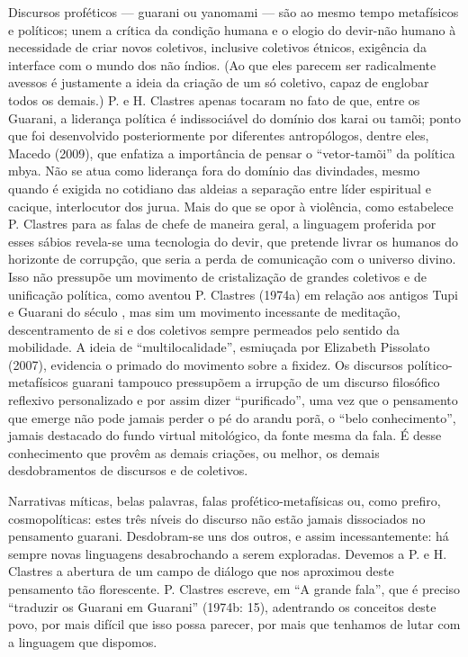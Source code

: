 Discursos proféticos --- guarani ou yanomami --- são ao mesmo tempo
metafísicos e políticos; unem a crítica da condição humana e o elogio
do devir-não humano à necessidade de criar novos coletivos, inclusive
coletivos étnicos, exigência da interface com o mundo dos não índios.
(Ao que eles parecem ser radicalmente avessos é justamente a ideia da
criação de um só coletivo, capaz de englobar todos os demais.) P. e H.
Clastres apenas tocaram no fato de que, entre os Guarani, a liderança
política é indissociável do domínio dos karai ou tamõi; ponto que foi
desenvolvido posteriormente por diferentes antropólogos, dentre eles,
Macedo (2009), que enfatiza a importância de pensar o ``vetor-tamõi'' da
política mbya. Não se atua como liderança fora do domínio das
divindades, mesmo quando é exigida no cotidiano das aldeias a separação
entre líder espiritual e cacique, interlocutor dos jurua. Mais do que
se opor à violência, como estabelece P. Clastres para as falas de chefe
de maneira geral, a linguagem proferida por esses sábios revela-se uma
tecnologia do devir, que pretende livrar os humanos do horizonte de
corrupção, que seria a perda de comunicação com o universo divino. Isso
não pressupõe um movimento de cristalização de grandes coletivos e de
unificação política, como aventou P. Clastres (1974a) em relação aos
antigos Tupi e Guarani do século , mas sim um movimento incessante
de meditação, descentramento de si e dos coletivos sempre permeados
pelo sentido da mobilidade. A ideia de ``multilocalidade'', esmiuçada por
Elizabeth Pissolato (2007), evidencia o primado do movimento sobre a
fixidez. Os discursos político-metafísicos guarani tampouco pressupõem
a irrupção de um discurso filosófico reflexivo personalizado e por
assim dizer ``purificado'', uma vez que o pensamento que emerge não pode
jamais perder o pé do arandu porã, o ``belo conhecimento'', jamais
destacado do fundo virtual mitológico, da fonte mesma da fala. É desse
conhecimento que provêm as demais criações, ou melhor, os demais
desdobramentos de discursos e de coletivos.

Narrativas míticas, belas palavras, falas profético-metafísicas ou, como
prefiro, cosmopolíticas: estes três níveis do discurso não estão jamais
dissociados no pensamento guarani. Desdobram-se uns dos outros, e assim
incessantemente: há sempre novas linguagens desabrochando a serem
exploradas. Devemos a P. e H. Clastres a abertura de um campo de
diálogo que nos aproximou deste pensamento tão florescente. P. Clastres
escreve, em ``A grande fala'', que é preciso ``traduzir os Guarani em
Guarani'' (1974b: 15), adentrando os conceitos deste povo, por mais
difícil que isso possa parecer, por mais que tenhamos de lutar com a
linguagem que dispomos. 

